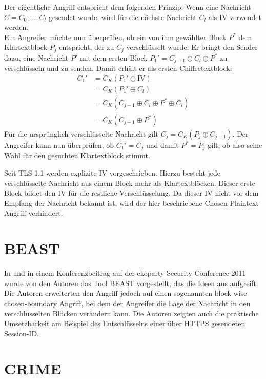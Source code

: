 Der eigentliche Angriff entspricht dem folgenden Prinzip: Wenn eine Nachricht \(C = C_0,\dots,C_l\) gesendet wurde, wird für die nächste Nachricht \(C_l\) als IV verwendet werden.\\
Ein Angreifer möchte nun überprüfen, ob ein von ihm gewählter Block \(P^*\) dem Klartextblock \(P_j\) entspricht, der zu \(C_j\) verschlüsselt wurde. Er bringt den Sender dazu, eine Nachricht \(P'\) mit dem ersten Block \(P_1'=C_{j-1} \oplus C_l \oplus P^*\) zu verschlüsseln und zu senden. Damit erhält er als ersten Chiffretextblock:
\begin{align*}
C_1' &= C_{K}(P_1' \oplus \text{IV})\\
	&= C_{K}(P_1' \oplus C_l)\\
	&= C_{K}(C_{j-1} \oplus C_l \oplus P^* \oplus C_l)\\
	&= C_{K}(C_{j-1} \oplus P^*)
\end{align*}
Für die ursprünglich verschlüsselte Nachricht gilt \(C_j= C_{K}(P_j \oplus C_{j-1})\). Der Angreifer kann nun überprüfen, ob \(C_1'=C_j\) und damit \(P^*=P_j\) gilt, ob also seine Wahl für den gesuchten Klartextblock stimmt.

Seit TLS 1.1 werden explizite IV vorgeschrieben. Hierzu besteht jede verschlüsselte Nachricht aus einem Block mehr als Klartextblöcken. Dieser erste Block bildet den IV für die restliche Verschlüsselung. Da dieser IV nicht vor dem Empfang der Nachricht bekannt ist, wird der hier beschriebene Chosen-Plaintext-Angriff verhindert.

\section{BEAST}
\label{sec_attack_beast}

In \cite{duong11} und in einem Konferenzbeitrag auf der ekoparty Security Conference 2011 wurde von den Autoren das Tool BEAST vorgestellt, das die Ideen aus \cite{bard04} aufgreift. Die Autoren erweiterten den Angriff jedoch auf einen sogenannten block-wise chosen-boundary Angriff, bei dem der Angreifer die Lage der Nachricht in den verschlüsselten Blöcken verändern kann. Die Autoren zeigten auch die praktische Umsetzbarkeit am Beispiel des Entschlüsselns einer über HTTPS gesendeten Session-ID.


\section{CRIME}
\label{sec_attack_crime}

